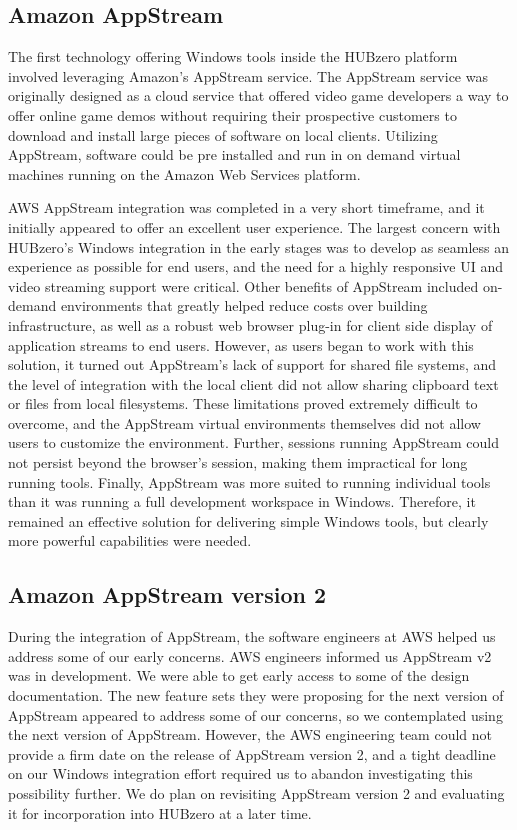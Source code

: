 \documentclass[conference]{../sty/IEEEtran}
\begin{document}
{\subsection{Amazon AppStream}

The first technology offering Windows tools inside the HUBzero platform involved leveraging Amazon’s AppStream service. The AppStream service was originally designed as a cloud service that offered video game developers a way to offer online game demos without requiring their prospective customers to download and install large pieces of software on local clients. Utilizing AppStream, software could be pre installed and run in on demand virtual machines running on the Amazon Web Services platform.

AWS AppStream integration was completed in a very short timeframe, and it initially appeared to offer an excellent user experience. The largest concern with HUBzero’s Windows integration in the early stages was to develop as seamless an experience as possible for end users, and the need for a highly responsive UI and video streaming support were critical. Other benefits of AppStream included on-demand environments that greatly helped reduce costs over building infrastructure, as well as a robust web browser plug-in for client side display of application streams to end users. However, as users began to work with this solution, it turned out AppStream’s lack of support for shared file systems, and the level of integration with the local client did not allow sharing clipboard text or files from local filesystems. These limitations proved extremely difficult to overcome, and the AppStream virtual environments themselves did not allow users to customize the environment.  Further, sessions running AppStream could not persist beyond the browser’s session, making them impractical for long running tools.  Finally, AppStream was more suited to running individual tools than it was running a full development workspace in Windows.  Therefore, it remained an effective solution for delivering simple Windows tools, but clearly more powerful capabilities were needed.



\subsection{Amazon AppStream version 2}

During the integration of AppStream, the software engineers at AWS helped us address some of our early concerns. AWS engineers informed us AppStream v2 was in development. We were able to get early access to some of the design documentation. The new feature sets they were proposing for the next version of AppStream appeared to address some of our concerns, so we contemplated using the next version of AppStream. However, the AWS engineering team could not provide a firm date on the release of AppStream version 2, and a tight deadline on our Windows integration effort required us to abandon investigating this possibility further. We do plan on revisiting AppStream version 2 and evaluating it for incorporation into HUBzero at a later time.



}
\end{document}
